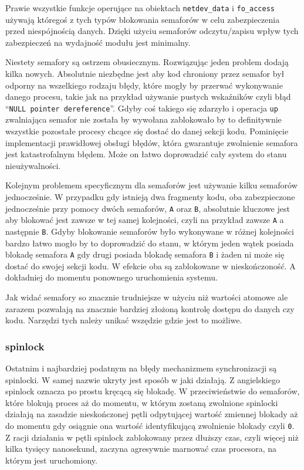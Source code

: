 \documentclass[10pt]{article}
\begin{document}
Prawie wszystkie funkcje operujące na obiektach \texttt{netdev\_data} i
\texttt{fo\_access} używają któregoś z tych typów blokowania semaforów w
celu zabezpieczenia przed niespójnością danych. Dzięki użyciu semaforów
odczytu/zapisu wpływ tych zabezpieczeń na wydajność modułu jest
minimalny.

Niestety semafory są ostrzem obusiecznym. Rozwiązując jeden problem
dodają kilka nowych. Absolutnie niezbędne jest aby kod chroniony przez
semafor był odporny na wszelkiego rodzaju błędy, które mogły by przerwać
wykonywanie danego procesu, takie jak na przykład używanie pustych
wskaźników czyli błąd ``\texttt{NULL pointer dereference}''. Gdyby coś
takiego się zdarzyło i operacja \texttt{up} zwalniająca semafor nie
została by wywołana zablokowało by to definitywnie wszystkie pozostałe
procesy chcące się dostać do danej sekcji kodu. Pominięcie implementacji
prawidłowej obsługi błędów, która gwarantuje zwolnienie semafora jest
katastrofalnym błędem. Może on łatwo doprowadzić cały system do stanu
nieużywalności.

Kolejnym problemem specyficznym dla semaforów jest używanie kilku
semaforów jednocześnie. W przypadku gdy istnieją dwa fragmenty kodu, oba
zabezpieczone jednocześnie przy pomocy dwóch semaforów, \texttt{A} oraz
\texttt{B}, absolutnie kluczowe jest aby blokować jest zawsze w tej
samej kolejności, czyli na przykład zawsze \texttt{A} a następnie
\texttt{B}. Gdyby blokowanie semaforów było wykonywane w różnej
kolejności bardzo łatwo mogło by to doprowadzić do stanu, w którym jeden
wątek posiada blokadę semafora \texttt{A} gdy drugi posiada blokadę
semafora \texttt{B} i żaden ni może się dostać do swojej sekcji kodu. W
efekcie oba są zablokowane w nieskończoność. A dokładniej do momentu
ponownego uruchomienia systemu.

Jak widać semafory so znacznie trudniejsze w użyciu niż wartości atomowe
ale zarazem pozwalają na znacznie bardziej złożoną kontrolę dostępu do
danych czy kodu. Narzędzi tych należy unikać wszędzie gdzie jest to
możliwe.

\subsubsection{spinlock}

Ostatnim i najbardziej podatnym na błędy mechanizmem synchronizacji są
spinlocki. W samej nazwie ukryty jest sposób w jaki działają. Z
angielskiego spinlock oznacza po prostu kręcącą się blokadę. W
przeciwieństwie do semaforów, które blokują proces aż do momentu, w
którym zostaną zwolnione spinlocki działają na zasadzie nieskończonej
pętli odpytującej wartość zmiennej blokady aż do momentu gdy osiągnie
ona wartość identyfikującą zwolnienie blokady czyli \texttt{0}. Z racji
działania w pętli spinlock zablokowany przez dłuższy czas, czyli więcej
niż kilka tysięcy nanosekund, zaczyna agresywnie marnować czas
procesora, na którym jest uruchomiony.
\end{document}

